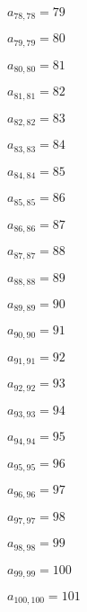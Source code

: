 \documentclass[a4paper,12pt]{article}
\begin{document}
$a _{ 78, 78 } = 79$

$a _{ 79, 79 } = 80$

$a _{ 80, 80 } = 81$

$a _{ 81, 81 } = 82$

$a _{ 82, 82 } = 83$

$a _{ 83, 83 } = 84$

$a _{ 84, 84 } = 85$

$a _{ 85, 85 } = 86$

$a _{ 86, 86 } = 87$

$a _{ 87, 87 } = 88$

$a _{ 88, 88 } = 89$

$a _{ 89, 89 } = 90$

$a _{ 90, 90 } = 91$

$a _{ 91, 91 } = 92$

$a _{ 92, 92 } = 93$

$a _{ 93, 93 } = 94$

$a _{ 94, 94 } = 95$

$a _{ 95, 95 } = 96$

$a _{ 96, 96 } = 97$

$a _{ 97, 97 } = 98$

$a _{ 98, 98 } = 99$

$a _{ 99, 99 } = 100$

$a _{ 100, 100 } = 101$
\end{document}
